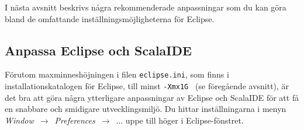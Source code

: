 \noindent I nästa avsnitt beskrivs några rekommenderade anpassningar som du kan göra bland de omfattande inställningsmöjligheterna för Eclipse.

\newpage

\subsection{Anpassa Eclipse och ScalaIDE}

\newcommand\MenuArrow[1]{\textit{#1}~$\rightarrow$~}
\newcommand\EclipsePrefs{\MenuArrow{Window}\MenuArrow{Preferences}}
\newcommand\EclipsePrefsGeneral{\EclipsePrefs\MenuArrow{General}}
\newcommand\FramedCheckmark[1]{~\frame{\checkmark}~~\textbf{#1}}
\newcommand\FramedUnchecked[1]{$\Box$~\textbf{#1}}
\newcommand\Button[1]{\fbox{\textbf{#1}}}

Förutom maxminneshöjningen i filen \texttt{eclipse.ini}, som finns i installationskatalogen för Eclipse, till minst \texttt{-Xmx1G } (se föregående avsnitt), är det bra att göra några ytterligare anpassningar av Eclipse och ScalaIDE för att få en snabbare och smidigare utvecklingsmiljö. Du hittar inställningarna i menyn \EclipsePrefs ... uppe till höger i Eclipse-fönstret.



